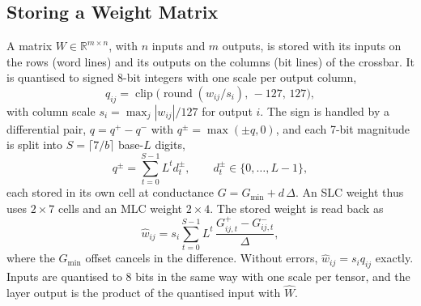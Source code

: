 \subsection{Storing a Weight Matrix}
A matrix $W\in\mathbb R^{m\times n}$, with $n$ inputs and $m$ outputs, is stored with its inputs on the rows
(word lines) and its outputs on the columns (bit lines) of the crossbar. It is quantised to signed 8-bit
integers with one scale per output column,
\begin{equation}
q_{ij}=\operatorname{clip}\!\big(\operatorname{round}(w_{ij}/s_i),\,-127,\,127\big),
\label{eq:quant}
\end{equation}
with column scale $s_i=\max_j|w_{ij}|/127$ for output $i$.
The sign is handled by a differential pair, $q=q^{+}-q^{-}$ with $q^{\pm}=\max(\pm q,0)$, and each
7-bit magnitude is split into $S=\lceil 7/b\rceil$ base-$L$ digits,
\begin{equation}
q^{\pm}=\sum_{t=0}^{S-1}L^{t}d_t^{\pm},\qquad d_t^{\pm}\in\{0,\dots,L-1\},
\label{eq:slice}
\end{equation}
each stored in its own cell at conductance $G=G_{\min}+d\,\Delta$. An SLC weight thus uses $2\times7$
cells and an MLC weight $2\times4$. The stored weight is read back as
\begin{equation}
\hat w_{ij}=s_i\sum_{t=0}^{S-1}L^{t}\,\frac{G^{+}_{ij,t}-G^{-}_{ij,t}}{\Delta},
\label{eq:readback}
\end{equation}
where the $G_{\min}$ offset cancels in the difference. Without errors, $\hat w_{ij}=s_iq_{ij}$ exactly.
Inputs are quantised to 8 bits in the same way with one scale per tensor, and the layer output is the
product of the quantised input with $\hat W$.

